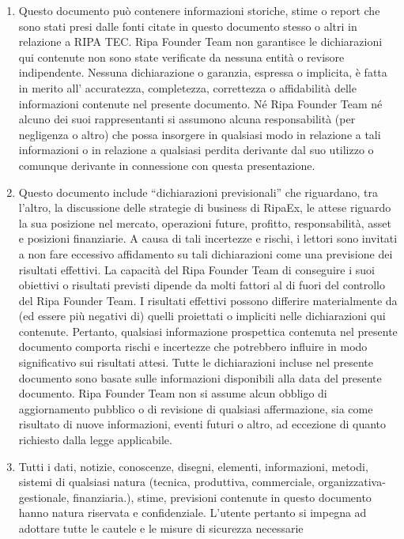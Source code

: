 \begin{scriptsize}
{\begin{enumerate}
\begin{description}
			\end{description}
			\item Questo documento può contenere informazioni storiche, stime o report che sono stati presi dalle fonti citate in 
			questo documento stesso o altri in relazione a RIPA TEC. Ripa Founder Team non garantisce le dichiarazioni qui contenute 
			non sono state verificate da nessuna entità o revisore indipendente. Nessuna dichiarazione o garanzia, espressa o implicita, 
			è fatta in merito all’ accuratezza, completezza, correttezza o affidabilità delle informazioni contenute nel presente 
			documento. Né Ripa Founder Team né alcuno dei suoi rappresentanti si assumono alcuna responsabilità (per negligenza o altro) 
			che possa insorgere in qualsiasi modo in relazione a tali informazioni o in relazione a qualsiasi perdita derivante dal suo 
			utilizzo o comunque derivante in connessione con questa presentazione.
			\item Questo documento include ``dichiarazioni previsionali'' che riguardano, tra l'altro, la discussione
			delle strategie di business di RipaEx, le attese riguardo la sua posizione nel mercato, operazioni future, profitto,
			responsabilità, asset e posizioni finanziarie. A causa di tali incertezze e rischi, i lettori sono invitati a non fare 
			eccessivo affidamento su tali dichiarazioni come una previsione dei risultati effettivi. La capacità del Ripa Founder Team 
			di conseguire i suoi obiettivi o risultati previsti dipende da molti fattori al di fuori del controllo del Ripa Founder Team. 
			I risultati effettivi possono differire materialmente da (ed essere più negativi di) quelli proiettati o impliciti nelle 
			dichiarazioni qui contenute. Pertanto, qualsiasi informazione prospettica contenuta nel presente documento comporta 
			rischi e incertezze che potrebbero influire in modo significativo sui risultati attesi. Tutte le dichiarazioni incluse nel 
			presente documento sono basate sulle informazioni disponibili alla data del presente documento. 
			Ripa Founder Team non si assume alcun obbligo di aggiornamento pubblico o di revisione di qualsiasi affermazione, 
			sia come risultato di nuove informazioni, eventi futuri o altro, ad eccezione di quanto richiesto dalla legge applicabile. 
			\item Tutti i dati, notizie, conoscenze, disegni, elementi, informazioni, metodi, sistemi di qualsiasi natura (tecnica, 
			produttiva, commerciale, organizzativa-gestionale, finanziaria.), stime, previsioni contenute in questo documento hanno 
			natura riservata e confidenziale. L’utente pertanto si impegna ad adottare tutte le cautele e le misure di sicurezza necessarie 

\end{enumerate}}
\end{scriptsize}
